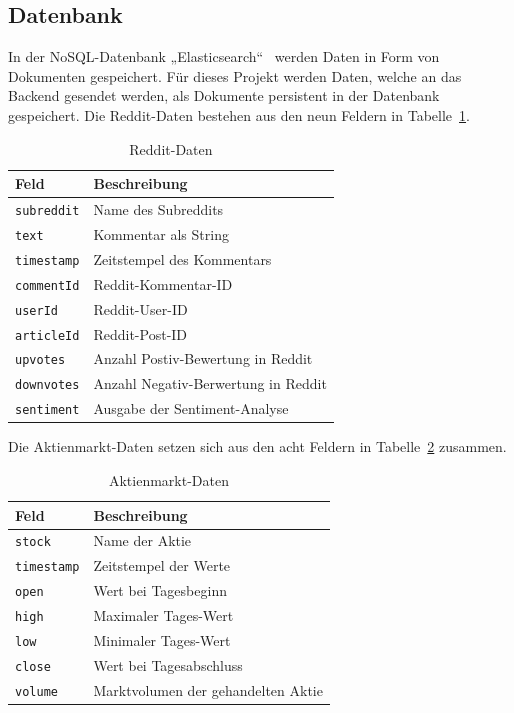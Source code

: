 \documentclass[a4paper, 10pt, conference]{IEEEtran}
\begin{document}
\subsection{Datenbank} \label{sub:database}
In der NoSQL-Datenbank „Elasticsearch“~\cite{elasticsearch} werden Daten in Form von Dokumenten gespeichert. Für dieses Projekt werden Daten, welche an das Backend gesendet werden, als Dokumente persistent in der Datenbank gespeichert. Die Reddit-Daten bestehen aus den neun Feldern in Tabelle~\ref{tab:reddit}.
\begin{table}[h!]
\begin{center}
\caption{Reddit-Daten}
\label{tab:reddit}
\begin{tabular}{|l|l|}
\textbf{Feld} & \textbf{Beschreibung}\\
\hline
\texttt{subreddit} 		& Name des Subreddits\\
\texttt{text} 			& Kommentar als String \\
\texttt{timestamp} 		& Zeitstempel des Kommentars\\
\texttt{commentId} 		& Reddit-Kommentar-ID\\
\texttt{userId} 		& Reddit-User-ID\\
\texttt{articleId} 		& Reddit-Post-ID\\
\texttt{upvotes} 		& Anzahl Postiv-Bewertung in Reddit\\
\texttt{downvotes} 		& Anzahl Negativ-Berwertung in Reddit \\
\texttt{sentiment} 		& Ausgabe der Sentiment-Analyse\\
\end{tabular}
\end{center}
\end{table}

Die Aktienmarkt-Daten setzen sich aus den acht Feldern in Tabelle~\ref{tab:stock} zusammen.

\begin{table}[h!]
\begin{center}
\caption{Aktienmarkt-Daten}
\label{tab:stock}
\begin{tabular}{|l|l|}
\textbf{Feld} & \textbf{Beschreibung}\\
\hline
\texttt{stock}		& Name der Aktie\\
\texttt{timestamp}	& Zeitstempel der Werte\\
\texttt{open}		& Wert bei Tagesbeginn\\
\texttt{high}		& Maximaler Tages-Wert\\
\texttt{low}		& Minimaler Tages-Wert\\
\texttt{close}		& Wert bei Tagesabschluss\\
\texttt{volume}		& Marktvolumen der gehandelten Aktie\\
\end{tabular}
\end{center}
\end{table}
\end{document}
